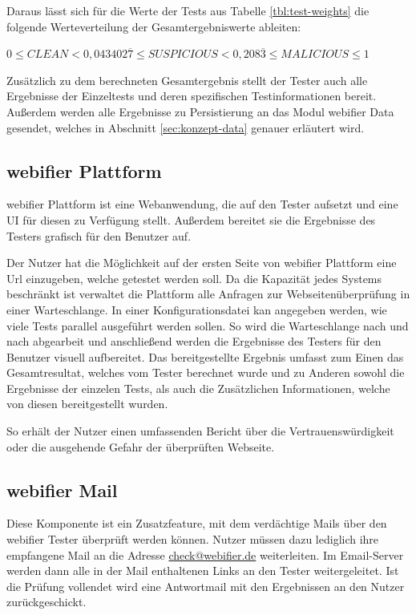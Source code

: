 Daraus lässt sich für die Werte der Tests aus Tabelle \ref{tbl:test-weights} die folgende Werteverteilung der Gesamtergebniswerte ableiten:

\begin{center}
$0 \leq CLEAN < 0,043402\overline{7} \leq SUSPICIOUS < 0,208\overline{3} \leq MALICIOUS \leq 1$
\end{center}

Zusätzlich zu dem berechneten Gesamtergebnis stellt der Tester auch alle Ergebnisse der Einzeltests und deren spezifischen Testinformationen bereit. Außerdem werden alle Ergebnisse zu Persistierung an das Modul webifier Data gesendet, welches in Abschnitt \ref{sec:konzept-data} genauer erläutert wird.

\subsection{webifier Plattform}

webifier Plattform ist eine Webanwendung, die auf den Tester aufsetzt und eine \ac{UI} für diesen zu Verfügung stellt. Außerdem bereitet sie die Ergebnisse des Testers grafisch für den Benutzer auf.

Der Nutzer hat die Möglichkeit auf der ersten Seite von webifier Plattform eine Url einzugeben, welche getestet werden soll. Da die Kapazität jedes Systems beschränkt ist verwaltet die Plattform alle Anfragen zur Webseitenüberprüfung in einer Warteschlange. In einer Konfigurationsdatei kan angegeben werden, wie viele Tests parallel ausgeführt werden sollen. So wird die Warteschlange nach und nach abgearbeit und anschließend werden die Ergebnisse des Testers für den Benutzer visuell aufbereitet. Das bereitgestellte Ergebnis umfasst zum Einen das Gesamtresultat, welches vom Tester berechnet wurde und zu Anderen sowohl die Ergebnisse der einzelen Tests, als auch die Zusätzlichen Informationen, welche von diesen bereitgestellt wurden.

So erhält der Nutzer einen umfassenden Bericht über die Vertrauenswürdigkeit oder die ausgehende Gefahr der überprüften Webseite.

\subsection{webifier Mail}

Diese Komponente ist ein Zusatzfeature, mit dem verdächtige Mails über den webifier Tester überprüft werden können.
Nutzer müssen dazu lediglich ihre empfangene Mail an die Adresse \href{mailto:check@webifier.de}{check@webifier.de} weiterleiten.
Im Email-Server werden dann alle in der Mail enthaltenen Links an den Tester weitergeleitet.
Ist die Prüfung vollendet wird eine Antwortmail mit den Ergebnissen an den Nutzer zurückgeschickt.


